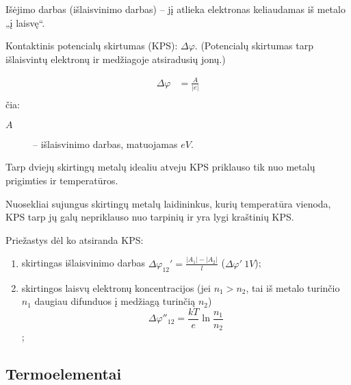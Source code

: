 

Išėjimo darbas (išlaisvinimo darbas) – jį atlieka elektronas keliaudamas
iš metalo „į laisvę“.

Kontaktinis potencialų skirtumas (KPS): $\Delta \varphi$. (Potencialų
skirtumas tarp išlaisvintų elektronų ir medžiagoje atsiradusių jonų.)

\begin{align*}
  \Delta \varphi &= \frac{A}{|e|} \\
\end{align*}
čia:
\begin{description}
  \item[$A$] – išlaisvinimo darbas, matuojamas $eV$.
\end{description}

\begin{defn}
  Tarp dviejų skirtingų metalų idealiu atveju KPS priklauso tik nuo
  metalų prigimties ir temperatūros.
\end{defn}

\begin{defn}
  Nuosekliai sujungus skirtingų metalų laidininkus, kurių temperatūra
  vienoda, KPS tarp jų galų nepriklauso nuo tarpinių ir yra lygi
  kraštinių KPS.
\end{defn}

Priežastys dėl ko atsiranda KPS:
\begin{enumerate}
  \item skirtingas išlaisvinimo darbas
    $\Delta \varphi_{12}' = \frac{|A_{1}| - |A_{2}|}{l}$
    ($\Delta \varphi' ~ 1 V$);
  \item skirtingos laisvų elektronų koncentracijos (jei $n_{1} > n_{2}$,
    tai iš metalo turinčio $n_{1}$ daugiau difunduos į medžiagą
    turinčią $n_{2}$)
  \begin{equation*}
    \Delta \varphi''_{12} = \frac{kT}{e}\ln\frac{n_{1}}{n_{2}}
  \end{equation*}
  ;
\end{enumerate}

\subsection{Termoelementai}

